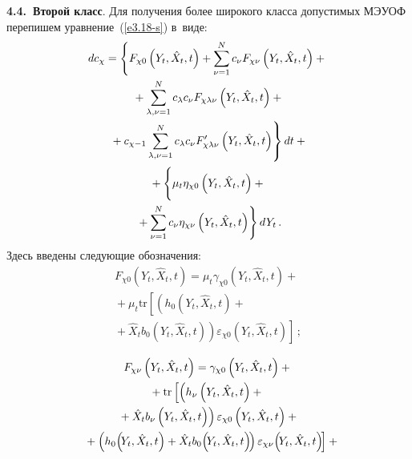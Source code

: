 \begin{multicols}{2}
\textbf{4.4.\ Второй класс}. Для получения более широкого класса
допустимых МЭУОФ перепишем уравнение~(\ref{e3.18-s}) в~виде:
    \begin{multline}
    dc_\chi = \left\{ F_{\chi 0}\left(Y_t,\hat X_t,t\right) + \sss_{\nu=1}^N
    c_\nu F_{\chi\nu} \left(Y_t,\hat X_t,t\right)+{}\right.\\
{}+\sss_{\lambda,\nu=1}^N c_\lambda  c_\nu F_{\chi\lambda\nu} 
\left(Y_t,\hat X_t,t\right) +{}\\
\left.{}+ c_{\chi-1} \sss_{\lambda,\nu=1}^N
    c_\lambda c_\nu F_{\chi\lambda\nu}' \left(Y_t,\hat X_t,t\right)\right\} dt+{}\\
{}+\left\{ \vphantom{\sss_{\nu=1}^N}
\mu_t
    \eta_{\chi 0} \left(Y_t,\hat X_t,t\right) +{}\right.\\
\left.    {}+ \sss_{\nu=1}^N c_\nu \eta_{\chi \nu}
    \left(Y_t,\hat X_t,t\right)\right\} dY_t\,.\label{e4.7-s}
    \end{multline}
Здесь введены следующие обозначения:
\begin{multline*}
    F_{\chi 0} \left(Y_t,\hat X_t,t\right) = 
    \mu_t\gamma_{\chi 0} \left(Y_t,\hat X_t,t\right)+{}\\
    {}+
    \mu_t \mathrm{tr} \left[ \left(h_0 \left(Y_t,\hat X_t,t\right)+{}\right.\right.\\
\left.\left.{}+ \hat X_t b_0 \left(Y_t,\hat X_t,t\right)\right) \varepsilon_{\chi 0} 
\left(Y_t,\hat X_t,t\right)\right]\,;
\end{multline*}

\vspace*{-12pt}

\noindent
\begin{multline*}
F_{\chi \nu} \left(Y_t,\hat X_t,t\right) =
    \gamma_{\chi 0} \left(Y_t,\hat X_t,t\right)+ {}\\
    {}+\mathrm{tr} 
    \left[ \left(h_\nu \left(Y_t,\hat X_t,t\right)+{}\right.\right.\\
    \left.    {}+
    \hat X_t b_\nu \left(Y_t,\hat X_t,t\right)\right) 
\varepsilon_{\chi 0} \left(Y_t,\hat X_t,t\right)
+{}\\
\left.{}+ \left(h_0 \!\left(\!Y_t,\hat X_t,t\right)+ 
\hat X_t b_0 \!\left(\!Y_t,\hat X_t,t\right)\!\right)
    \varepsilon_{\chi \nu}\! \left(\!Y_t,\hat X_t,t\right)\!\right]+{}\hspace*{-6.10587pt}
    \end{multline*}
    

\end{multicols}
